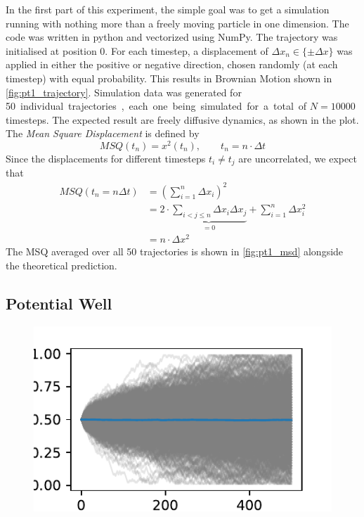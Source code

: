 \documentclass[
    parskip=half, 
    twoside=false,
    twocolumn=true,
    fontsize=11pt,
]{scrarticle}
\begin{document}
In the first part of this experiment, the simple goal was to get a simulation running with nothing more than a freely moving particle in one dimension. The code was written in python and vectorized using NumPy. The trajectory was initialised at position \SI{0}{}. For each timestep, a displacement of $\Delta x_n \in \{\pm \Delta x\}$ was applied in either the positive or negative direction, chosen randomly (at each timestep) with equal probability. This results in Brownian Motion shown in \autoref{fig:pt1_trajectory}. Simulation data was generated for \SI{50} individual trajectories, each one being simulated for a total of $N=\SI{10000}{}$ timesteps. The expected result are freely diffusive dynamics, as shown in the plot. The \textit{Mean Square Displacement} is defined by
\begin{equation}
 MSQ(t_n) = x^2(t_n), \qquad t_n = n \cdot \Delta t
\end{equation}
Since the displacements for different timesteps $t_i\neq t_j$ are uncorrelated, we expect that
\begin{align}
 MSQ(t_n = n \Delta t) &= \left(\sum_{i=1}^n \Delta x_i\right)^2 \\&= 2 \cdot \underbrace{\sum_{i<j\leq n} \Delta x_i \Delta x_j}_{=0} + \sum_{i=1}^n \Delta x_i^2 \\ &= n \cdot \Delta x^2
\end{align}
The MSQ averaged over all \SI{50}{} trajectories is shown in \autoref{fig:pt1_msd} alongside the theoretical prediction.


\subsection{Potential Well}
\begin{figure}
\label{fig:pt2_trajectory}
 \includegraphics{figures/02 time evolution.pdf}
\end{figure}
\end{document}
